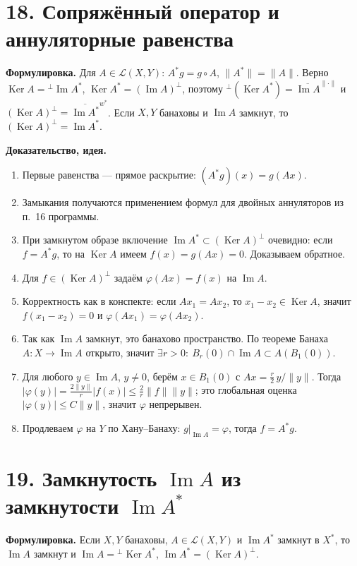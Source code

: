 \documentclass[10pt,a4paper]{article}
\newcommand{\X}{X}
\newcommand{\Ker}{\operatorname{Ker}}
\begin{document}
	\section*{18. Сопряжённый оператор и аннуляторные равенства}
	\textbf{Формулировка.} Для $A\in\mathcal L(\X,Y)$: $A^\ast g=g\circ A$, $\|A^\ast\|=\|A\|$. Верно $\Ker A={}^\perp\operatorname{Im}A^\ast$, $\Ker A^\ast=(\operatorname{Im}A)^\perp$, поэтому ${}^\perp(\Ker A^\ast)=\overline{\operatorname{Im}A}^{\|\cdot\|}$ и $(\Ker A)^\perp=\overline{\operatorname{Im}A^\ast}^{w^\ast}$. Если $\X,Y$ банаховы и $\operatorname{Im}A$ замкнут, то $(\Ker A)^\perp=\operatorname{Im}A^\ast$.

	\textbf{Доказательство, идея.}
	\begin{enumerate}
		\item Первые равенства --- прямое раскрытие: $(A^\ast g)(x)=g(Ax)$.
		\item Замыкания получаются применением формул для двойных аннуляторов из п.~16 программы.
		\item При замкнутом образе включение $\operatorname{Im}A^\ast\subset(\Ker A)^\perp$ очевидно: если $f=A^\ast g$, то на $\Ker A$ имеем $f(x)=g(Ax)=0$. Доказываем обратное.
		\item Для $f\in(\Ker A)^\perp$ задаём $\varphi(Ax)=f(x)$ на $\operatorname{Im}A$.
		\item Корректность как в конспекте: если $Ax_1=Ax_2$, то $x_1-x_2\in\Ker A$, значит $f(x_1-x_2)=0$ и $\varphi(Ax_1)=\varphi(Ax_2)$.
		\item Так как $\operatorname{Im}A$ замкнут, это банахово пространство. По теореме Банаха $A:\X\to\operatorname{Im}A$ открыто, значит $\exists r>0:\ B_r(0)\cap\operatorname{Im}A\subset A(B_1(0))$.
		\item Для любого $y\in\operatorname{Im}A$, $y\ne0$, берём $x\in B_1(0)$ с $Ax=\frac r2\,y/\|y\|$. Тогда $|\varphi(y)|=\frac{2\|y\|}{r}|f(x)|\le\frac{2}{r}\|f\|\|y\|$; это глобальная оценка $|\varphi(y)|\le C\|y\|$, значит $\varphi$ непрерывен.
		\item Продлеваем $\varphi$ на $Y$ по Хану--Банаху: $g|_{\operatorname{Im}A}=\varphi$, тогда $f=A^\ast g$.
	\end{enumerate}

	\section*{19. Замкнутость $\operatorname{Im}A$ из замкнутости $\operatorname{Im}A^\ast$}
	\textbf{Формулировка.} Если $\X,Y$ банаховы, $A\in\mathcal L(\X,Y)$ и $\operatorname{Im}A^\ast$ замкнут в $\X^\ast$, то $\operatorname{Im}A$ замкнут и $\operatorname{Im}A={}^\perp\Ker A^\ast$, $\operatorname{Im}A^\ast=(\Ker A)^\perp$.
\end{document}
